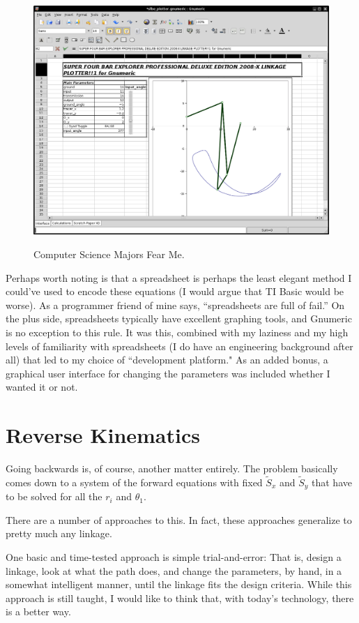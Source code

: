 \documentclass[12pt, letterpaper]{article}
\begin{document}
\begin{figure}[H]
\centering
\caption{Computer Science Majors Fear Me.}
\includegraphics[width=5.0in]{plotter}
\label{fig:plotter}
\end{figure}

Perhaps worth noting is that a spreadsheet is perhaps the least elegant method I could've used to encode these equations (I would argue that TI Basic would be worse). As a programmer friend of mine says, ``spreadsheets are full of fail.'' On the plus side, spreadsheets typically have excellent graphing tools, and Gnumeric is no exception to this rule. It was this, combined with my laziness and my high levels of familiarity with spreadsheets (I do have an engineering background after all) that led to my choice of ``development platform." As an added bonus, a graphical user interface for changing the parameters was included whether I wanted it or not.

\section*{Reverse Kinematics}

Going backwards is, of course, another matter entirely. The problem basically comes down to a system of the forward equations with fixed \(\tilde{S}_x\) and \(\tilde{S}_y\) that have to be solved for all the \(r_i\) and \(\theta_1\).

There are a number of approaches to this. In fact, these approaches generalize to pretty much any linkage.

One basic and time-tested approach is simple trial-and-error: That is, design a linkage, look at what the path does, and change the parameters, by hand, in a somewhat intelligent manner, until the linkage fits the design criteria. While this approach is still taught, I would like to think that, with today's technology, there is a better way.
\end{document}
